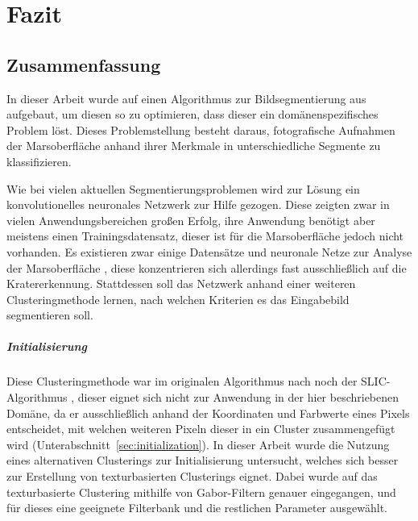\chapter{Fazit}
\label{chap:fazit}

\section{Zusammenfassung}

In dieser Arbeit wurde auf einen Algorithmus zur Bildsegmentierung aus \cite{kanezaki_18} aufgebaut, um diesen so zu optimieren, dass dieser ein domänenspezifisches Problem löst. Dieses Problemstellung besteht daraus, fotografische Aufnahmen der Marsoberfläche anhand ihrer Merkmale in unterschiedliche Segmente zu klassifizieren.

Wie bei vielen aktuellen Segmentierungsproblemen wird zur Lösung ein konvolutionelles neuronales Netzwerk zur Hilfe gezogen. Diese zeigten zwar in vielen Anwendungsbereichen großen Erfolg, ihre Anwendung benötigt aber meistens einen Trainingsdatensatz, dieser ist für die Marsoberfläche jedoch nicht vorhanden. Es existieren zwar einige Datensätze und neuronale Netze zur Analyse der Marsoberfläche \cite{cohen_16}, diese konzentrieren sich allerdings fast ausschließlich auf die Kratererkennung. Stattdessen soll das Netzwerk anhand einer weiteren Clusteringmethode lernen, nach welchen Kriterien es das Eingabebild segmentieren soll.

\paragraph{Initialisierung} Diese Clusteringmethode war im originalen Algorithmus nach \cite{kanezaki_18} noch der SLIC-Algorithmus \cite{achanta_10}, dieser eignet sich nicht zur Anwendung in der hier beschriebenen Domäne, da er ausschließlich anhand der Koordinaten und Farbwerte eines Pixels entscheidet, mit welchen weiteren Pixeln dieser in ein Cluster zusammengefügt wird (\vgl Unterabschnitt~\ref{sec:initialization}). In dieser Arbeit wurde die Nutzung eines alternativen Clusterings zur Initialisierung untersucht, welches sich besser zur Erstellung von texturbasierten Clusterings eignet. Dabei wurde auf das texturbasierte Clustering mithilfe von Gabor-Filtern \cite{jain_91} genauer eingegangen, und für dieses eine geeignete Filterbank und die restlichen Parameter ausgewählt.


